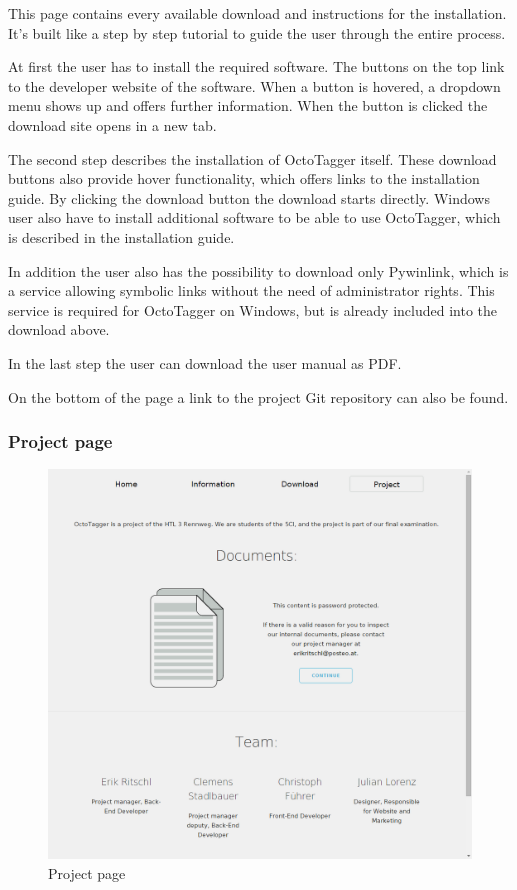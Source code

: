 This page contains every available download and instructions for the installation. It's built like a step by step tutorial to guide the user through the entire process.

At first the user has to install the required software. The buttons on the top link to the developer website of the software. When a button is hovered, a dropdown menu shows up and offers further information. When the button is clicked the download site opens in a new tab.
 
The second step describes the installation of OctoTagger itself. These download buttons also provide hover functionality, which offers links to the installation guide. By clicking the download button the download starts directly. Windows user also have to install additional software to be able to use OctoTagger, which is described in the installation guide. 

In addition the user also has the possibility to download only Pywinlink, which is a service allowing symbolic links without the need of administrator rights. This service is required for OctoTagger on Windows, but is already included into the download above.

In the last step the user can download the user manual as PDF.

On the bottom of the page a link to the project Git repository can also be found.

\subsubsection{Project page}

\begin{figure}
\centering
\includegraphics[scale=0.35]{images/project_full.png}
\caption{Project page}
\end{figure}

